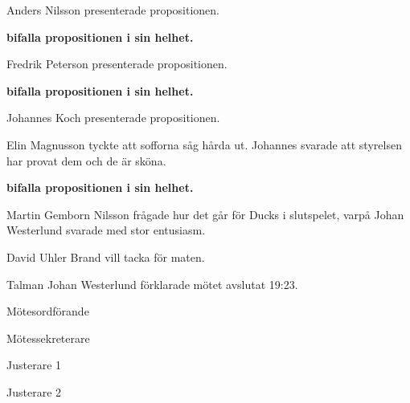 \documentclass[10pt]{article}
\def\mo{Johan Westerlund}
\def\ms{Erik Månsson}
\def\ji{Olle Oswald}
\def\jii{David Uhler Brand}
\begin{document}
\begin{paragrafer}
\begin{paragrafer}
          Anders Nilsson presenterade propositionen.

          \textbf{\Mba bifalla propositionen i sin helhet.}

        Fredrik Peterson presenterade propositionen.

        \textbf{\Mba bifalla propositionen i sin helhet.}

        Johannes Koch presenterade propositionen.

        Elin Magnusson tyckte att sofforna såg hårda ut. Johannes svarade att styrelsen har provat dem och de är sköna.

        \textbf{\Mba bifalla propositionen i sin helhet.}

  \end{paragrafer}
Martin Gemborn Nilsson frågade hur det går för Ducks i slutspelet, varpå Johan Westerlund svarade med stor entusiasm.

David Uhler Brand vill tacka för maten.

Talman {\mo} förklarade mötet avslutat 19:23.

\end{paragrafer}

\hidesignfoot
\begin{signatures}{4}
\signature{\mo}{Mötesordförande}
\signature{\ms}{Mötessekreterare}
\signature{\ji}{Justerare 1}
\signature{\jii}{Justerare 2}
\end{signatures}
\end{document}
